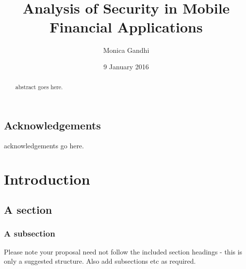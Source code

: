 \documentclass{mproj}
\begin{document}
\title{Analysis of Security in Mobile Financial Applications}
\author{Monica Gandhi}
\date{9 January 2016}
\maketitle

\begin{abstract}
abstract goes here.
\end{abstract}

\educationalconsent


\newpage
\section*{Acknowledgements}

acknowledgements go here.

\tableofcontents

\chapter{Introduction}\label{intro}

\section{A section}
\subsection{A subsection}
Please note your proposal need not follow the included section headings - this is only a suggested structure. Also add subsections etc as required.

\end{document}
